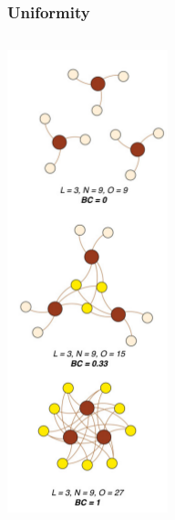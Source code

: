 \documentclass{beamer}
\begin{document}
\begin{frame}
  \frametitle{Uniformity}

  \begin{columns}
    \begin{column}{0.6\textwidth}
      \begin{center}
        \includegraphics[height=0.8\textheight,width=\textwidth,keepaspectratio=true]{figure/bc}


\end{center}
\end{column}
\end{columns}
\end{frame}
\end{document}
